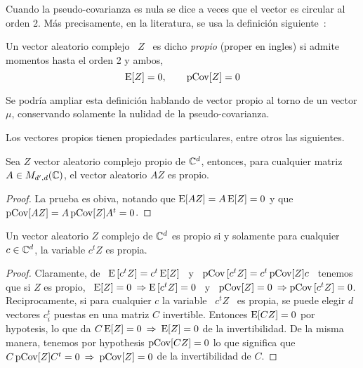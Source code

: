 Cuando la pseudo-covarianza es nula se dice a veces que el vector es circular al
orden  2.  M\'as  precisamente,  en   la  literatura,  se  usa  la  definici\'on
siguiente~\cite[Def.~17.4.1]{Lap17}:
%
\begin{definicion}\label{Def:MP:VectorAleatorioComplejoPropio}
%
  Un vector aleatorio complejo \ $Z$  \ es dicho {\em propio} (proper en ingles)
  si admite momentos hasta el orden 2 y ambos,
  \[
  \operatorname{E}[Z] = 0, \qquad \operatorname{pCov}[Z] = 0
  \]
\end{definicion}
%
Se podr\'ia ampliar  esta definici\'on hablando de vector propio  al torno de un
vector $\mu$, conservando solamente la nulidad de la pseudo-covarianza.

Los vectores propios tienen  propiedades particulares, entre otros las siguientes.

\begin{teorema}\label{Teo:MP:PropioLineal}
%
  Sea  $Z$  vector  aleatorio  complejo  propio  de  $\mathbb{C}^d$,  entonces,  para
  cualquier matriz $A \in M_{d',d}(\mathbb{C})$, el vector aleatorio $A Z$ es propio.
\end{teorema}
\begin{proof}
  La prueba es obiva, notando que $\operatorname{E}[A Z]  = A \operatorname{E}[Z] = 0$ y que $\operatorname{pCov}[A Z]
  = A \operatorname{pCov}[Z] A^t = 0$.
\end{proof}


\begin{teorema}\label{Teo:MP:PropioProy}
%
  Un vector  aleatorio $Z$ complejo de  $\mathbb{C}^d$ es propio si  y solamente para
  cualquier $c \in \mathbb{C}^d$, la variable $c^t Z$ es propia.
\end{teorema}
\begin{proof}
  Claramente, de \  $\operatorname{E}\left[ c^t Z \right] = c^t \operatorname{E}[Z]$  \ y \ $\operatorname{pCov}\left[
    c^t Z \right] = c^t \operatorname{pCov}[Z] c$ \ tenemos que si $Z$ es propio, \ $\operatorname{E}[Z] =
  0  \: \Rightarrow  \operatorname{E}\left[ c^t  Z  \right] =  0$ \  y  \ $\operatorname{pCov}[Z]  = 0  \:
  \Rightarrow \operatorname{pCov}\left[  c^tZ \right] =  0$. \newline Reciprocamente,  si para
  cualquier $c$ la variable \ $c^t Z$  \ es propia, se puede elegir $d$ vectores
  $c_i^t$ puestas  en una matriz  $C$ invertible. Entonces  $\operatorname{E}[C Z] =  0$ por
  hypotesis, lo  que da  $C \operatorname{E}[Z] =  0 \:  \Rightarrow \: \operatorname{E}[Z]  = 0$  de la
  invertibilidad. De la misma manera, tenemos por hypothesis $\operatorname{pCov}[C Z] = 0$ lo
  que significa que  $C \operatorname{pCov}[Z] C^t = 0  \: \Rightarrow \: \operatorname{pCov}[Z] =  0$ de la
  invertibilidad de $C$.
\end{proof}

